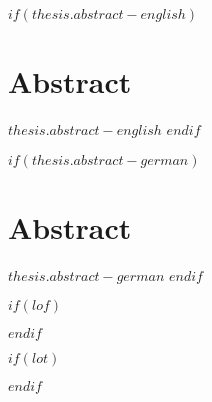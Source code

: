\newpage




$if(thesis.abstract-english)$
\section*{\sffamily Abstract}
\normalsize{$thesis.abstract-english$}
\vspace*{\baselineskip}
\clearpage
$endif$


$if(thesis.abstract-german)$
\section*{\sffamily Abstract}
\normalsize{$thesis.abstract-german$}
\clearpage
$endif$



$if(lof)$
    \listoffigures
$endif$




$if(lot)$
    \listoftables
$endif$

